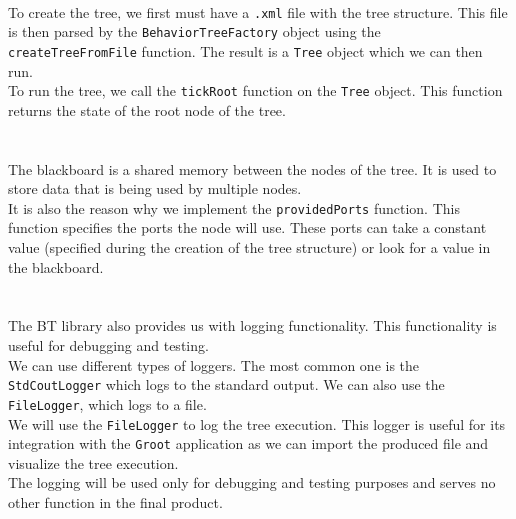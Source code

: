         \\
            To create the tree, we first must have a \texttt{.xml} file with the tree structure. This file is then parsed by the \texttt{BehaviorTreeFactory} object using the \texttt{createTreeFromFile} function. The result is a \texttt{Tree} object which we can then run.\\
            To run the tree, we call the \texttt{tickRoot} function on the \texttt{Tree} object. This function returns the state of the root node of the tree.\\\\
        \\
            The blackboard is a shared memory between the nodes of the tree. It is used to store data that is being used by multiple nodes.\\
            It is also the reason why we implement the \texttt{providedPorts} function. This function specifies the ports the node will use. These ports can take a constant value (specified during the creation of the tree structure) or look for a value in the blackboard.\\\\
        \\
            The BT library also provides us with logging functionality. This functionality is useful for debugging and testing.\\
            We can use different types of loggers. The most common one is the \texttt{StdCoutLogger} which logs to the standard output. We can also use the \texttt{FileLogger}, which logs to a file.\\
            We will use the \texttt{FileLogger} to log the tree execution. This logger is useful for its integration with the \texttt{Groot} application as we can import the produced file and visualize the tree execution.\\
            The logging will be used only for debugging and testing purposes and serves no other function in the final product.
